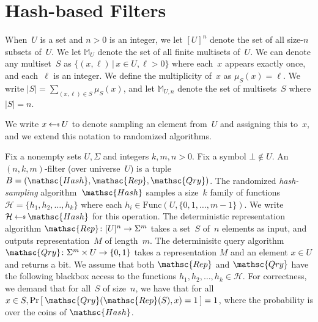 \newcommand{\Rep}{\mathsc{Rep}}
\newcommand{\Hash}{\mathsc{Hash}}
\newcommand{\Qry}{\mathsc{Qry}}
\newcommand{\Update}{\mathsc{Up}}
\newcommand{\Init}{\mathsc{Init}}
\newcommand{\Test}{\mathsc{Test}}
\newcommand{\multiset}[1]{\mathbb{M}_{#1}}
\newcommand{\ExpCorrectSecHash}[2]{\mathrm{Exp}^{\mathrm{cor\mbox{-}prv}}_{#1}(#2)}
\newcommand{\ExpCorrectPubHash}[2]{\mathrm{Exp}^{\mathrm{cor\mbox{-}pub}}_{#1}(#2)}
\newcommand{\ExpCorrect}[2]{\mathrm{Exp}^{\mathrm{cor}}_{#1}(#2)}

\newcommand{\ExpFPSecHash}[2]{\mathrm{Exp}^{\mathrm{fp\mbox{-}prv}}_{#1}(#2)}
\newcommand{\ExpFPPubHash}[2]{\mathrm{Exp}^{\mathrm{fp\mbox{-}pub}}_{#1}(#2)}
\newcommand{\ExpFP}[2]{\mathrm{Exp}^{\mathrm{fp}}_{#1}(#2)}

\newcommand{\QryOracle}{\mathsf{Query}}
\newcommand{\UpdateOracle}{\mathsf{Update}}
\newcommand{\HashOracle}{\mathsf{Hash}}

\section{Hash-based Filters}
When~$U$ is a set and $n>0$ is an integer, we let $[U]^n$ denote the set of all size-$n$ subsets of~$U$.  We let $\multiset{U}$ denote the set of all finite multisets of~$U$.  We can denote any multiset~$S$ as $\{(x,\ell) \,|\, x \in U, \ell > 0\}$ where each~$x$ appears exactly once, and each~$\ell$ is an integer.  We define the multiplicity of~$x$ as $\mu_S(x) = \ell$.  We write $|S|= \sum_{(x,\ell)\in S}\mu_S(x)$, and let $\multiset{U,n}$ denote the set of multisets~$S$ where $|S|=n$. 

We write $x \getsr U$ to denote sampling an element from~$U$ and assigning this to~$x$, and we extend this notation to randomized algorithms.

Fix a nonempty sets $U,\Sigma$ and integers $k,m,n>0$.  Fix a symbol $\bot \not\in U$.  An $(n,k,m)$-filter (over universe~$U$) is a tuple  $B=(\Hash,\Rep,\Qry)$.   
%
The randomized \emph{hash-sampling} algorithm~$\Hash$ samples a size~$k$ family of functions~$\mathcal{H}=\{h_1,h_2,\ldots,h_k\}$ where each $h_i \in  \mathrm{Func}(U,\{0,1,\ldots,m-1\})$.  We write $\mathcal{H} \getsr \Hash$ for this operation.
%
The deterministic representation algorithm $\Rep\colon [U]^n \rightarrow \Sigma^m$ takes a set~$S$ of~$n$ elements as input, and outputs representation~$M$ of length~$m$.
%
The determinisitc query algorithm $\Qry\colon \Sigma^m \times U \rightarrow \bits$ takes a representation $M$ and an element $x \in U$ and returns a bit.  
%
We assume that both $\Rep$ and $\Qry$ have the following blackbox access to the functions $h_1,h_2,\ldots,h_k \in \mathcal{H}$.
%
For correctness, we demand that for all~$S$ of size~$n$, we have that for all $x \in S, \Prob{\Qry(\Rep(S),x)=1}=1$, where the probability is over the coins of $\Hash$.  


